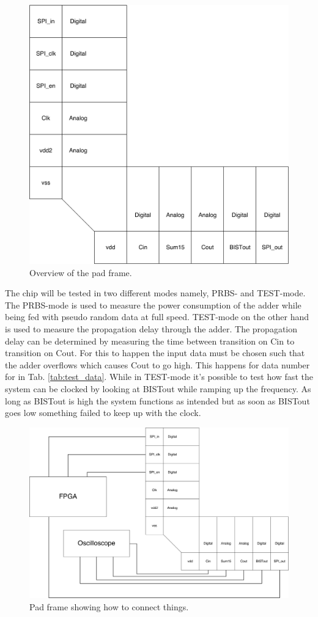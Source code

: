 \begin{figure}[H]
\centering
\captionsetup{justification=centering}
\includegraphics[scale=0.1]{../figures/padframe.png}
\caption{Overview of the pad frame.} \label{fig:padframe}
\end{figure}

The chip will be tested in two different modes namely, PRBS- and TEST-mode. The PRBS-mode is used to measure the power consumption of the adder while being fed with pseudo random data at full speed. TEST-mode on the other hand is used to measure the propagation delay through the adder. The propagation delay can be determined by measuring the time between transition on Cin to transition on Cout. For this to happen the input data must be chosen such that the adder overflows which causes Cout to go high. This happens for data number for in Tab. \ref{tab:test_data}. While in TEST-mode it's possible to test how fast the system can be clocked by looking at BISTout while ramping up the frequency. As long as BISTout is high the system functions as intended but as soon as BISTout goes low something failed to keep up with the clock.

\begin{figure}[H]
\centering
\captionsetup{justification=centering}
\includegraphics[scale=0.07]{../figures/evaluation_setup.png}
\caption{Pad frame showing how to connect things.} \label{fig:setup}
\end{figure} 